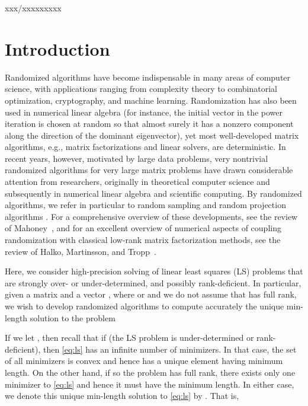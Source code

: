 \documentclass{siamltex}
\begin{document}
\begin{DOI}
   xxx/xxxxxxxxx
\end{DOI}


\section{Introduction}
\label{sec:introduction}

Randomized algorithms have become indispensable in many areas of computer
science, with applications ranging from complexity theory to combinatorial
optimization, cryptography, and machine learning.  Randomization has also been
used in numerical linear algebra (for instance, the initial vector in the power
iteration is chosen at random so that almost surely it has a nonzero component
along the direction of the dominant eigenvector), yet most well-developed matrix
algorithms, e.g., matrix factorizations and linear solvers, are deterministic.
In recent years, however, motivated by large data problems, very
nontrivial randomized algorithms for very large matrix problems have drawn
considerable attention from researchers, originally in theoretical computer
science and subsequently in numerical linear algebra and scientific computing.
By randomized algorithms, we refer in particular to random sampling and random
projection algorithms
\cite{drineas2006sampling,sarlos2006improved,drineas2007faster,rokhlin2008fast,avron2010blendenpik}.
For a comprehensive overview of these developments, see the review of
Mahoney~\cite{Mah-mat-rev_BOOK}, and for an excellent overview of numerical
aspects of coupling randomization with classical low-rank matrix factorization
methods, see the review of Halko, Martinsson, and Tropp~\cite{halko2011finding}.

Here, we consider high-precision solving of linear least squares (LS) problems
that are strongly over- or under-determined, and possibly rank-deficient.  In
particular, given a matrix  and a vector , where  or  and we do not assume that  has
full rank, we wish to develop randomized algorithms to compute accurately the
unique min-length solution to the problem

If we let , then recall that if  (the LS
problem is under-determined or rank-deficient), then \eqref{eq:ls} has an
infinite number of minimizers.  In that case, the set of all minimizers is
convex and hence has a unique element having minimum length.  On the other hand,
if  so the problem has full rank, there exists only one minimizer
to \eqref{eq:ls} and hence it must have the minimum length.  In either case, we
denote this unique min-length solution to \eqref{eq:ls} by .  That is,
\end{document}
